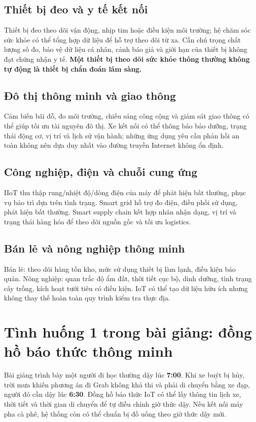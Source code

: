 \subsection{Thiết bị đeo và y tế kết nối}
Thiết bị đeo theo dõi vận động, nhịp tim hoặc điều kiện môi trường; hệ chăm sóc sức khỏe có thể tổng hợp dữ liệu để hỗ trợ theo dõi từ xa. Cần chú trọng chất lượng số đo, bảo vệ dữ liệu cá nhân, cảnh báo giả và giới hạn của thiết bị không đạt chứng nhận y tế. \textbf{Một thiết bị theo dõi sức khỏe thông thường không tự động là thiết bị chẩn đoán lâm sàng.}
\subsection{Đô thị thông minh và giao thông}
Cảm biến bãi đỗ, đo môi trường, chiếu sáng công cộng và giám sát giao thông có thể giúp tối ưu tài nguyên đô thị. Xe kết nối có thể thông báo bảo dưỡng, trạng thái động cơ, vị trí và lịch sử vận hành; những ứng dụng yêu cầu phản hồi an toàn không nên dựa duy nhất vào đường truyền Internet không ổn định.
\subsection{Công nghiệp, điện và chuỗi cung ứng}
IIoT thu thập rung/nhiệt độ/dòng điện của máy để phát hiện bất thường, phục vụ bảo trì dựa trên tình trạng. Smart grid hỗ trợ đo điện, điều phối sử dụng, phát hiện bất thường. Smart supply chain kết hợp nhãn nhận dạng, vị trí và trạng thái hàng hóa để theo dõi nguồn gốc và tối ưu logistics.
\subsection{Bán lẻ và nông nghiệp thông minh}
Bán lẻ: theo dõi hàng tồn kho, mức sử dụng thiết bị làm lạnh, điều kiện bảo quản. Nông nghiệp: quan trắc độ ẩm đất, thời tiết cục bộ, dinh dưỡng, tình trạng cây trồng, kích hoạt tưới tiêu có điều kiện. IoT có thể tạo dữ liệu hữu ích nhưng không thay thế hoàn toàn quy trình kiểm tra thực địa.

\section{Tình huống 1 trong bài giảng: đồng hồ báo thức thông minh}
Bài giảng trình bày một người đi học thường dậy lúc \textbf{7:00}. Khi xe buýt bị hủy, trời mưa khiến phương án đi Grab không khả thi và phải di chuyển bằng xe đạp, người đó cần dậy lúc \textbf{6:30}. Đồng hồ báo thức IoT có thể lấy thông tin lịch xe, thời tiết và thời gian di chuyển để tự điều chỉnh giờ thức dậy. Nếu kết nối máy pha cà phê, hệ thống còn có thể chuẩn bị đồ uống theo giờ thức dậy mới.

